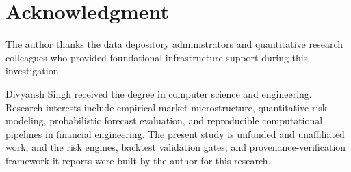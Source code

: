\documentclass{ieeeaccess}
\begin{document}
\section*{Acknowledgment}
The author thanks the data depository administrators and quantitative research colleagues who provided foundational infrastructure support during this investigation.




\begin{IEEEbiographynophoto}{Divyansh Singh}
received the degree in computer science and engineering. Research interests include empirical market microstructure, quantitative risk modeling, probabilistic forecast evaluation, and reproducible computational pipelines in financial engineering. The present study is unfunded and unaffiliated work, and the risk engines, backtest validation gates, and provenance-verification framework it reports were built by the author for this research.
\end{IEEEbiographynophoto}

\EOD
\end{document}
